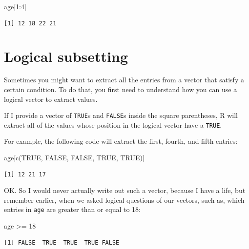 \documentclass[
  letterpaper,
  DIV=11,
  numbers=noendperiod]{scrreprt}
\newenvironment{Shaded}{\begin{snugshade}}{\end{snugshade}}
\newcommand{\ConstantTok}[1]{\textcolor[rgb]{0.56,0.35,0.01}{#1}}
\newcommand{\DecValTok}[1]{\textcolor[rgb]{0.68,0.00,0.00}{#1}}
\newcommand{\FunctionTok}[1]{\textcolor[rgb]{0.28,0.35,0.67}{#1}}
\newcommand{\NormalTok}[1]{\textcolor[rgb]{0.00,0.23,0.31}{#1}}
\newcommand{\SpecialCharTok}[1]{\textcolor[rgb]{0.37,0.37,0.37}{#1}}
\begin{document}
\begin{Shaded}
\begin{Highlighting}[]
\NormalTok{age[}\DecValTok{1}\SpecialCharTok{:}\DecValTok{4}\NormalTok{]}
\end{Highlighting}
\end{Shaded}

\begin{verbatim}
[1] 12 18 22 21
\end{verbatim}

\section{Logical subsetting}\label{sec-logical-subsetting}

Sometimes you might want to extract all the entries from a vector that
satisfy a certain condition. To do that, you first need to understand
how you can use a logical vector to extract values.

If I provide a vector of \texttt{TRUE}s and \texttt{FALSE}s inside the
square parentheses, R will extract all of the values whose position in
the logical vector have a \texttt{TRUE}.

For example, the following code will extract the first, fourth, and
fifth entries:

\begin{Shaded}
\begin{Highlighting}[]
\NormalTok{age[}\FunctionTok{c}\NormalTok{(}\ConstantTok{TRUE}\NormalTok{, }\ConstantTok{FALSE}\NormalTok{, }\ConstantTok{FALSE}\NormalTok{, }\ConstantTok{TRUE}\NormalTok{, }\ConstantTok{TRUE}\NormalTok{)]}
\end{Highlighting}
\end{Shaded}

\begin{verbatim}
[1] 12 21 17
\end{verbatim}

OK. So I would never actually write out such a vector, because I have a
life, but remember earlier, when we asked logical questions of our
vectors, such as, which entries in \texttt{age} are greater than or
equal to 18:

\begin{Shaded}
\begin{Highlighting}[]
\NormalTok{age }\SpecialCharTok{\textgreater{}=} \DecValTok{18}
\end{Highlighting}
\end{Shaded}

\begin{verbatim}
[1] FALSE  TRUE  TRUE  TRUE FALSE
\end{verbatim}
\end{document}
